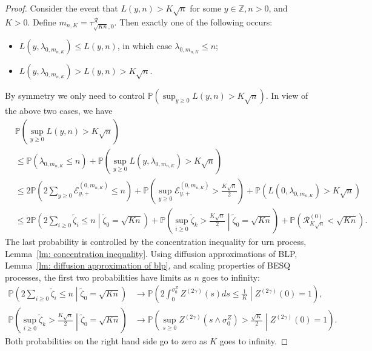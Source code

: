 \documentclass[EJP]{ejpecp} %
\begin{document}
\begin{proof}
	Consider the event that $L(y, n) > K \sqrt{n} $ for some $y \in \mathbb{Z}, n>0$, and $K > 0$. Define $m_{n, K } = \tau^{\mathscr{R}}_{\sqrt{K n},0 }$. Then exactly one of the following occurs:
	\begin{itemize}
		\item $L(y, \lambda_{0, m_{n, K}}) \le L(y, n)$, in which case $\lambda_{0, m_{n, K}} \le  n$;
		\item $L(y, \lambda_{0, m_{n, K}}) >  L(y, n)  > K \sqrt{n} $.
	\end{itemize}
	By symmetry we only need to control $\mathbb{P}\left( \sup _{y \ge  0} L(y, n) > K \sqrt{n}  \right) $. In view of the above two cases, we have
	\begin{align*}
		&\mathbb{P}\left( \sup _{y \ge  0} L(y, n) > K \sqrt{n}  \right) \\
		&\le \mathbb{P}\left( \lambda_{0, m_{n, K}} \le n \right) + \mathbb{P}\left( \sup _{y \ge 0} L\left( y, \lambda_{0, m_{n, K}}\right)   > K \sqrt{n}  \right)  \\
		&\le 2\mathbb{P}\left( 2 \sum_{y \ge 0} \mathcal{E}_{y, +}^{(0,m_{n, K})} \le n \right) + \mathbb{P}\left( \sup _{y \ge 0} \mathcal{E}_{y,+}^{\left( 0,m_{n, K} \right) }   > \frac{K \sqrt{n} }{2}  \right)+ \mathbb{P}\left( L(0,\lambda_{0, m_{n, K}}) > K \sqrt{n}  \right)  \\
		&\le 
		2\mathbb{P}\left( 2 \sum_{i \ge  0} \tilde \zeta_i \le  n \middle| \tilde\zeta_0 = \sqrt{K n} \right) + 
		\mathbb{P}\left( \sup _{i \ge 0} \tilde \zeta_k > \frac{K \sqrt{n} }{2} \middle| \tilde \zeta_0 = \sqrt{K n}   \right)+ 
		\mathbb{P}\left( \mathscr{R}^{(0)} _{K \sqrt{n} } < \sqrt{K n}  \right) 
		.\end{align*}
	The last probability is controlled by the concentration inequality for urn process, Lemma~\ref{lm: concentration inequality}. Using diffusion approximations of BLP, Lemma~\ref{lm: diffusion approximation of blp}, and scaling properties of BESQ processes, the first two probabilities have limits as $n$ goes to infinity:
	\begin{align*}
		\mathbb{P}\left( 2 \sum_{i \ge  0} \tilde \zeta_i \le  n \middle| \tilde\zeta_0 = \sqrt{K n} \right) 
		&\to 
		\mathbb{P}\left(2 \int _0^{\sigma_0^{Z}} Z^{(2 \gamma)}(s) d s \le \frac{1}{K} \middle| Z^{(2 \gamma)}(0) = 1 \right),\\
		\mathbb{P}\left( \sup _{i \ge 0} \tilde \zeta_k > \frac{K \sqrt{n} }{2} \middle| \tilde \zeta_0 = \sqrt{K n}   \right)
		&\to 
		\mathbb{P}\left( \sup_{s \ge 0} Z^{(2 \gamma)}(s \wedge \sigma_0^{Z}) > \frac{\sqrt{K} }{2} \middle| Z^{(2 \gamma)} (0) = 1 \right) 
		.\end{align*} 
	Both probabilities on the right hand side go to zero as $K$ goes to infinity. 
\end{proof}
\end{document}
